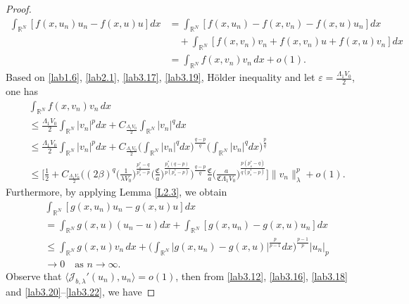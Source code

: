 \documentclass[10pt,a4paper]{amsart}
\numberwithin{equation}{section}
\begin{document}
\begin{proof}
\begin{equation}\label{lab3.20}
\begin{split}
\int_{\mathbb{R}^N} [f(x,u_n)u_n-f(x,u)u]dx 
&=\int_{\mathbb{R}^N} [f(x,u_n)-f(x,v_n)-f(x,u)u_n]dx \\
&\quad +\int_{\mathbb{R}^N} [f(x,v_n)v_n+f(x,v_n)u+f(x,u)v_n]dx  \\
&=\int_{\mathbb{R}^N} f(x,v_n)v_n\,dx+o(1).
\end{split}
\end{equation}
Based on \eqref{lab1.6}, \eqref{lab2.1}, \eqref{lab3.17}, \eqref{lab3.19}, 
H\"older inequality and let $\varepsilon=\frac{\Lambda_1 V_0}{2}$, one has
\begin{equation}\label{lab3.21}
\begin{split}
&\int_{\mathbb{R}^N} f(x,v_n)v_n\,dx \\
&\leq \frac{\Lambda_1 V_0}{2}\int_{\mathbb{R}^N}|v_n|^pdx+C_{\frac{\Lambda_1 V_0}{2}}\int_{\mathbb{R}^N}|v_n|^qdx \\
&\leq \frac{\Lambda_1 V_0}{2}\int_{\mathbb{R}^N}|v_n|^pdx
+C_{\frac{\Lambda_1 V_0}{2}}\Big(\int_{\mathbb{R}^N}|v_n|^qdx
 \Big)^{\frac{q-p}{q}}\Big(\int_{\mathbb{R}^N}|v_n|^qdx\Big)^{\frac{p}{q}}  \\
&\leq \Big[\frac{1}{2}+C_{\frac{\Lambda_1 V_0}{2}}\Big((2\beta)^q
 \Big(\frac{1}{\lambda V_0}\Big)^{\frac{p_s^*-q}{p_s^*-p}}
 \Big(\frac{\mathfrak{C}}{a}\Big)^{\frac{p_s^*(q-p)}{p(p_s^*-p)}}\Big)
^{\frac{q-p}{q}}\frac{\mathfrak{C}}{a} 
 \Big(\frac{a}{\mathfrak{C}\Lambda_1V_0}\Big)^{\frac{p(p^*_s-q)}{q(p^*_s-p)}}
 \Big]\|v_n\|^p_\lambda+o(1).
\end{split}
\end{equation}
Furthermore, by applying Lemma \ref{L2.3}, we  obtain 
\begin{equation}\label{lab3.22}
\begin{split}
&\int_{\mathbb{R}^N}[g(x,u_n)u_n-g(x,u)u]dx  \\
&=\int_{\mathbb{R}^N} g(x,u)(u_n-u)dx+\int_{\mathbb{R}^N} [g(x,u_n)-g(x,u)u_n]dx \\
&\leq\int_{\mathbb{R}^N} g(x,u)v_n\,dx+\Big(\int_{\mathbb{R}^N} |g(x,u_n)-g(x,u)|^{\frac{p}{p-1}}dx\Big)^{\frac{p-1}{p}}|u_n|_p \\
&\to  0\quad \text{as }  n\to \infty.
\end{split}
\end{equation}
Observe that $\langle \mathcal{J}_{b,\lambda}'(u_n), u_n\rangle=o(1)$, 
then from \eqref{lab3.12}, \eqref{lab3.16}, \eqref{lab3.18} and 
\eqref{lab3.20}--\eqref{lab3.22}, we have

\end{proof}
\end{document}
